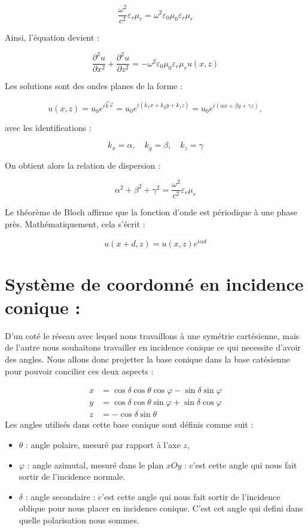 \documentclass{article}
\begin{document}
\[
\frac{\omega^2}{c^2} \varepsilon_r \mu_r = \omega^2 \varepsilon_0 \mu_0 \varepsilon_r \mu_r
\]

Ainsi, l'équation devient :

\[
\frac{\partial^2 u}{\partial x^2} + \frac{\partial^2 u}{\partial z^2} = -\omega^2 \varepsilon_0 \mu_0 \varepsilon_r \mu_r  u(x, z)
\]

Les solutions sont des ondes planes de la forme :

\[
u(x, z) = u_0 e^{i \vec{k}  \vec{r}} = u_0 e^{i(k_x x + k_y y + k_z z)} = u_0 e^{i(\alpha x + \beta y + \gamma z)},
\]

avec les identifications :

\[
k_x = \alpha, \quad k_y = \beta, \quad k_z = \gamma
\]

On obtient alors la relation de dispersion :

\[
\alpha^2 + \beta^2 + \gamma^2 = \frac{\omega^2}{c^2} \varepsilon_r \mu_r
\]

Le théorème de Bloch affirme que la fonction d'onde est périodique à une phase près. Mathématiquement, cela s’écrit :

\[
u(x + d, z) = u(x, z) e^{i \alpha d}
\]

\section*{Système de coordonné en incidence conique :}

D'un coté le réseau avec lequel nous travaillons à une symétrie cartésienne, mais de l'autre nous souhaitons travailler en incidence conique ce qui necessite d'avoir des angles. Nous allons donc projetter la base conique dans la base catésienne pour pouvoir concilier ces deux aspects : 

\begin{align*}
x &= \cos\delta \cos\theta \cos\varphi - \sin\delta \sin\varphi \\
y &= \cos\delta \cos\theta \sin\varphi + \sin\delta \cos\varphi \\
z &= -\cos\delta \sin\theta
\end{align*}
\noindent
Les angles utilisés dans cette base conique sont définis comme suit :
\begin{itemize}
  \item \( \theta \) : angle polaire, mesuré par rapport à l’axe \( z \),
  \item \( \varphi \) : angle azimutal, mesuré dans le plan \( xOy \) : c'est cette angle qui nous fait sortir de l'incidence normale.
  \item \( \delta \) : angle secondaire : c'est cette angle qui nous fait sortir de l'incidence oblique pour nous placer en incidence conique. C'est cet angle qui defini dans quelle polarisation nous sommes.
\end{itemize}
\end{document}
